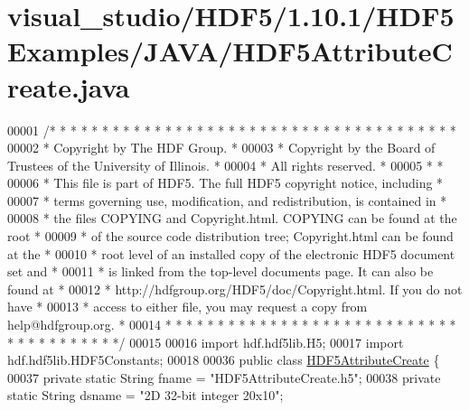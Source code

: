 \hypertarget{visual__studio_2_h_d_f5_21_810_81_2_h_d_f5_examples_2_j_a_v_a_2_h_d_f5_attribute_create_8java_source}{}\section{visual\+\_\+studio/\+H\+D\+F5/1.10.1/\+H\+D\+F5\+Examples/\+J\+A\+V\+A/\+H\+D\+F5\+Attribute\+Create.java}
\label{visual__studio_2_h_d_f5_21_810_81_2_h_d_f5_examples_2_j_a_v_a_2_h_d_f5_attribute_create_8java_source}

\begin{DoxyCode}
00001 \textcolor{comment}{/* * * * * * * * * * * * * * * * * * * * * * * * * * * * * * * * * * * * * * *}
00002 \textcolor{comment}{ * Copyright by The HDF Group.                                               *}
00003 \textcolor{comment}{ * Copyright by the Board of Trustees of the University of Illinois.         *}
00004 \textcolor{comment}{ * All rights reserved.                                                      *}
00005 \textcolor{comment}{ *                                                                           *}
00006 \textcolor{comment}{ * This file is part of HDF5.  The full HDF5 copyright notice, including     *}
00007 \textcolor{comment}{ * terms governing use, modification, and redistribution, is contained in    *}
00008 \textcolor{comment}{ * the files COPYING and Copyright.html.  COPYING can be found at the root   *}
00009 \textcolor{comment}{ * of the source code distribution tree; Copyright.html can be found at the  *}
00010 \textcolor{comment}{ * root level of an installed copy of the electronic HDF5 document set and   *}
00011 \textcolor{comment}{ * is linked from the top-level documents page.  It can also be found at     *}
00012 \textcolor{comment}{ * http://hdfgroup.org/HDF5/doc/Copyright.html.  If you do not have          *}
00013 \textcolor{comment}{ * access to either file, you may request a copy from help@hdfgroup.org.     *}
00014 \textcolor{comment}{ * * * * * * * * * * * * * * * * * * * * * * * * * * * * * * * * * * * * * * */}
00015 
00016 \textcolor{keyword}{import} hdf.hdf5lib.H5;
00017 \textcolor{keyword}{import} hdf.hdf5lib.HDF5Constants;
00018 
00036 \textcolor{keyword}{public} \textcolor{keyword}{class }\hyperlink{class_h_d_f5_attribute_create}{HDF5AttributeCreate} \{
00037     \textcolor{keyword}{private} \textcolor{keyword}{static} String fname  = \textcolor{stringliteral}{"HDF5AttributeCreate.h5"};
00038     \textcolor{keyword}{private} \textcolor{keyword}{static} String dsname  = \textcolor{stringliteral}{"2D 32-bit integer 20x10"};

\end{DoxyCode}
